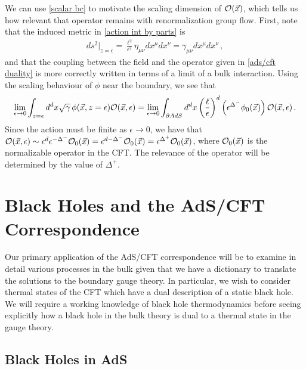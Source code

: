 \documentclass[../PhD.tex]{subfiles}
\begin{document}
We can use \eqref{scalar bc} to motivate the scaling dimension of $\mathcal O (\vec x)$, which tells us how relevant that operator remains with renormalization group flow. First, note that the induced metric in \eqref{action int by parts} is
\begin{align}
ds^2 \Big|_{z=\epsilon} = \frac{\ell^2}{\epsilon^2} \eta_{\mu \nu} dx^\mu dx^\nu = \gamma_{\mu \nu} dx^\mu dx^\nu \, ,
\end{align}
and that the coupling between the field and the operator given in \eqref{ads/cft duality} is more correctly written in terms of a limit of a bulk interaction. Using the scaling behaviour of $\phi$ near the boundary, we see that
\begin{align}
\lim_{\epsilon \to 0} \int_{z=\epsilon} d^{d}x \sqrt{\gamma} \, \phi(\vec x, z = \epsilon) \mathcal O(\vec x, \epsilon) = \lim_{\epsilon \to 0} \int_{\partial AdS} d^d x \left(\frac{\ell}{\epsilon}\right)^d \left( \epsilon^{\Delta^-} \phi_0 (\vec x) \right) \mathcal O (\vec x, \epsilon) \, .
\end{align}
Since the action must be finite as $\epsilon \to 0$, we have that $ \mathcal O(\vec x, \epsilon) \sim \epsilon^{d} \epsilon^{-\Delta^-} \mathcal O_0 (\vec x) = \epsilon^{d - \Delta^-} \mathcal O_0 (\vec x) = \epsilon^{\Delta^+} \mathcal O_0 (\vec x)$, where $\mathcal O_0(\vec x)$ is the normalizable operator in the CFT. The relevance of the operator will be determined by the value of $\Delta^+$.


	
\section{Black Holes and the AdS/CFT Correspondence}
\label{sec: bh in ads}

Our primary application of the AdS/CFT correspondence will be to examine in detail various processes in the bulk given that we have a dictionary to translate the solutions to the boundary gauge theory. In particular, we wish to consider thermal states of the CFT which have a dual description of a static black hole. We will require a working knowledge of black hole thermodynamics before seeing explicitly how a black hole in the bulk theory is dual to a thermal state in the gauge theory.


\subsection{Black Holes in AdS}
\label{sub: bh in ads}
\end{document}
